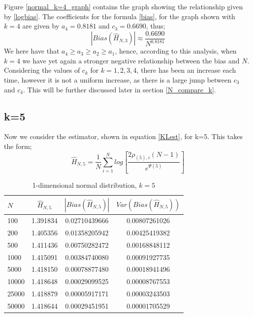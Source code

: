 \documentclass{report}
\begin{document}
Figure \ref{normal_k=4_graph} contains the graph showing the relationship given by \ref{logbias}. The coefficients for the formula \ref{bias}, for the graph shown with $k=4$ are given by $a_{4} = 0.8181$ and $c_{3} = 0.6690$, thus;
\begin{equation}
|Bias(\hat{H}_{N, 3})| \approx \frac{0.6690}{N^{0.8181}} \nonumber
\end{equation}
 We here have that $a_{4} \geq a_{3} \geq a_{2} \geq a_{1}$, hence, according to this analysis, when $k=4$ we have yet again a stronger negative relationship between the bias and $N$. Considering the values of $c_{k}$ for $k=1,2,3,4$, there has been an increase each time, however it is not a uniform increase, as there is a large jump between $c_{3}$ and $c_{4}$. This will be further discussed later in section \ref{N_compare_k}.




\subsection{k=5} \label{N_k=5}
Now we consider the estimator, shown in equation \ref{KLest}, for k=5. This takes the form;
\begin{equation}
\hat{H}_{N, 5} = \frac{1}{N} \sum_{i=1}^{N} log \left[ \frac{2\rho_{(5),i}(N-1)}{e^{\Psi(5)}} \right] \nonumber
\end{equation}

\begin{table}
\caption{1-dimensional normal distribution, $k=5$} \label{normal_k=5_table}
\begin{center}
\begin{tabular}{| l | c c c|} 
\toprule
$N$ & $\hat{H}_{N, 5}$ & $|Bias(\hat{H}_{N, 5})|$ & $Var(Bias(\hat{H}_{N, 5}))$ \\
\midrule[1pt]
100     & 1.391834     & 0.02710439666     & 0.00807261026  \\
200     & 1.405356     & 0.01358205942     & 0.00425419382  \\
500     & 1.411436     & 0.00750282472     & 0.00168848112  \\
1000    & 1.415091     & 0.00384740080     & 0.00091927735  \\
5000    & 1.418150     & 0.00078877480     & 0.00018941496  \\
10000   & 1.418648     & 0.00029099525     & 0.00008767553  \\
25000   & 1.418879     & 0.00005917171     & 0.00003243503  \\
50000   & 1.418644     & 0.00029451951     & 0.00001705529  \\
\hline
\end{tabular}
\end{center}
\end{table}
\end{document}
